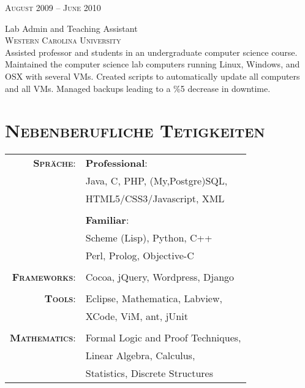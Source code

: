 \documentclass[10pt]{article}
\begin{document}
\begin{minipage}[t]{0.5\textwidth}
   \raggedleft
   \textsc{\normalsize August 2009 -- June 2010}\par
   \raggedright\large Lab Admin and Teaching Assistant\\ 
   \textsc{Western Carolina University}\\
   \normalsize{Assisted professor and students in an undergraduate computer science course. Maintained the computer science lab computers running Linux, Windows, and OSX with several VMs. Created scripts to automatically update all computers and all VMs. Managed backups leading to a \%5 decrease in downtime.}\\[5pt]

\section{\textsc{Nebenberufliche Tetigkeiten}}
   \begin{tabular}{rl}
      \textbf{\textsc{Spräche}}:
                        & \textbf{Professional}:\\
                        & Java, C, PHP, (My,Postgre)SQL, \\
                        & HTML5/CSS3/Javascript, XML\\
                        & \\
                        & \textbf{Familiar}:\\
                        & Scheme (Lisp), Python, C++\\
                        & Perl, Prolog, Objective-C\\
                        & \\
      \textbf{\textsc{Frameworks}}:
                        & Cocoa, jQuery, Wordpress, Django\\
                        & \\
      \textbf{\textsc{Tools}}:
                        & Eclipse, Mathematica, Labview,\\
                        & XCode, ViM, ant, jUnit\\
                        & \\
      \textbf{\textsc{Mathematics}}:
                        & Formal Logic and Proof Techniques,\\
                        & Linear Algebra, Calculus,\\
                        & Statistics, Discrete Structures\\
\end{tabular}
\end{minipage} %
\end{document}

